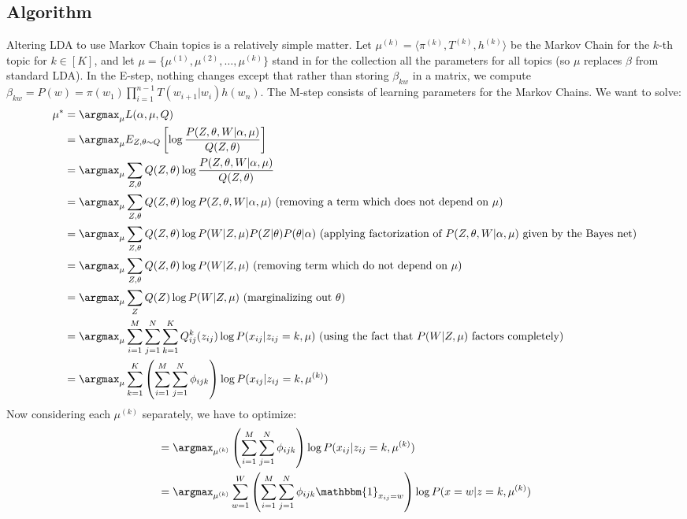 \subsection{Algorithm}
Altering LDA to use Markov Chain topics is a relatively simple matter. Let $\mu^{(k)} =  \langle \pi^{(k)}, T^{(k)}, h^{(k)} \rangle$ be the Markov Chain for the $k$-th topic for $k \in [K]$, and let $\mu = \{\mu^{(1)}, \mu^{(2)}, \dots, \mu^{(k)}\}$ stand in for the collection all the parameters for all topics (so $\mu$ replaces $\beta$ from standard LDA). In the E-step, nothing changes except that rather than storing $\beta_{kw}$ in a matrix, we compute $\beta_{kw} = P(w) = \pi(w_1) \prod_{i=1}^{n-1} T(w_{i+1}| w_i) h(w_n)$. The M-step consists of learning parameters for the Markov Chains. We want to solve:
\begin{align}
    \mu^*
    &= \argmax_{\mu} L(\alpha, \mu, Q)\\
    &= \argmax_{\mu} E_{Z, \theta \sim Q}\left[\log \frac{P(Z, \theta, W | \alpha, \mu)}{Q(Z, \theta)}\right]\\
    &= \argmax_{\mu} \sum_{Z, \theta}Q(Z, \theta) \log \frac{P(Z, \theta, W | \alpha, \mu)}{Q(Z, \theta)}\\
    &= \argmax_{\mu} \sum_{Z, \theta}Q(Z, \theta) \log P(Z, \theta, W | \alpha, \mu)~\text{(removing a term which does not depend on $\mu$)}\\
    &= \argmax_{\mu} \sum_{Z, \theta}Q(Z, \theta) \log P(W | Z, \mu) P(Z | \theta) P(\theta | \alpha)~\text{(applying factorization of $P(Z, \theta, W | \alpha, \mu)$ given by the Bayes net)}\\
    &= \argmax_{\mu} \sum_{Z, \theta}Q(Z, \theta) \log P(W | Z, \mu)~\text{(removing term which do not depend on $\mu$)}\\
    &= \argmax_{\mu} \sum_{Z}Q(Z) \log P(W | Z, \mu)~\text{(marginalizing out $\theta$)}\\
    &= \argmax_{\mu} \sum_{i=1}^M \sum_{j=1}^N \sum_{k=1}^K Q^k_{ij}(z_{ij}) \log P(x_{ij} | z_{ij} = k, \mu)~\text{(using the fact that $P(W | Z, \mu)$ factors completely)}\\
    &= \argmax_{\mu} \sum_{k=1}^K \left(\sum_{i=1}^M \sum_{j=1}^N \phi_{ijk}\right) \log P(x_{ij} | z_{ij} = k, \mu^{(k)})
\end{align}
Now considering each $\mu^{(k)}$ separately, we have to optimize:
\begin{align}
    &= \argmax_{\mu^{(k)}} \left(\sum_{i=1}^M \sum_{j=1}^N \phi_{ijk}\right) \log P(x_{ij} | z_{ij} = k, \mu^{(k)})\\
    &= \argmax_{\mu^{(k)}} \sum_{w=1}^W \left(\sum_{i=1}^M \sum_{j=1}^N \phi_{ijk} \mathbbm{1}_{x_{ij} = w}\right) \log P(x = w | z = k, \mu^{(k)})
\end{align}
